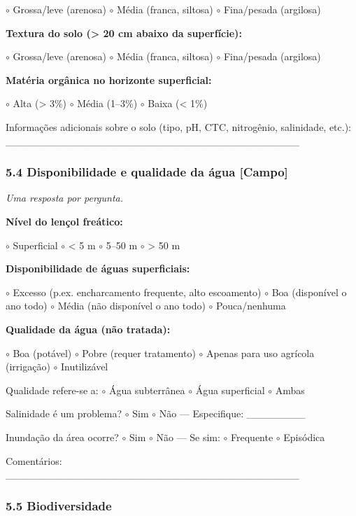 $\circ$ Grossa/leve (arenosa) $\circ$ Média (franca, siltosa) $\circ$ Fina/pesada (argilosa)

\textbf{Textura do solo (\textgreater{} 20 cm abaixo da superfície):}

$\circ$ Grossa/leve (arenosa) $\circ$ Média (franca, siltosa) $\circ$ Fina/pesada (argilosa)

\textbf{Matéria orgânica no horizonte superficial:}

$\circ$ Alta (\textgreater{} 3\%) $\circ$ Média (1--3\%) $\circ$ Baixa (\textless{} 1\%)

Informações adicionais sobre o solo (tipo, pH, CTC, nitrogênio, salinidade, etc.): \_\_\_\_\_\_\_\_\_\_\_\_\_\_\_\_\_\_\_\_\_\_\_\_\_\_\_\_\_\_\_\_\_\_\_\_\_\_\_\_

\subsubsection{5.4 Disponibilidade e qualidade da água {[Campo]}}\label{disponibilidade-e-qualidade-da-uxe1gua}

\emph{Uma resposta por pergunta.}

\textbf{Nível do lençol freático:}

$\circ$ Superficial $\circ$ \textless{} 5 m $\circ$ 5--50 m $\circ$ \textgreater{} 50 m

\textbf{Disponibilidade de águas superficiais:}

$\circ$ Excesso (p.ex. encharcamento frequente, alto escoamento) $\circ$ Boa (disponível o ano todo) $\circ$ Média (não disponível o ano todo) $\circ$ Pouca/nenhuma

\textbf{Qualidade da água (não tratada):}

$\circ$ Boa (potável) $\circ$ Pobre (requer tratamento) $\circ$ Apenas para uso agrícola (irrigação) $\circ$ Inutilizável

Qualidade refere-se a: $\circ$ Água subterrânea $\circ$ Água superficial $\circ$ Ambas

Salinidade é um problema? $\circ$ Sim $\circ$ Não --- Especifique: \_\_\_\_\_\_\_\_

Inundação da área ocorre? $\circ$ Sim $\circ$ Não --- Se sim: $\circ$ Frequente $\circ$ Episódica

Comentários: \_\_\_\_\_\_\_\_\_\_\_\_\_\_\_\_\_\_\_\_\_\_\_\_\_\_\_\_\_\_\_\_\_\_\_\_\_\_\_\_

\subsubsection{5.5 Biodiversidade}\label{biodiversidade}

